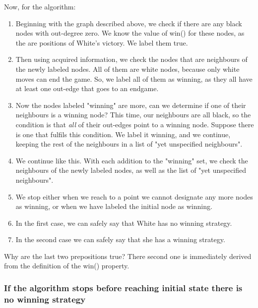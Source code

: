 Now, for the algorithm:

\begin{enumerate}
\item
Beginning with the graph described above, we check if there are any black nodes with out-degree zero. We know the value of win() for these nodes,
as the are positions of White's victory. We label them true.
\item Then using
acquired information, we check the nodes that are neighbours of the newly labeled nodes. All of them are white nodes, because only white moves can end the
game. So, we label all of them as winning, as they all have at least one
out-edge that goes to an endgame.
\item  Now the nodes labeled "winning" are more, can we determine if one of their neighbours is a winning node? This time, our neighbours are all black, so the condition is that \emph{all} of their out-edges point to a winning node. Suppose
there is one that fulfils this condition. We label it winning, and we continue,
keeping the rest of the neighbours in a list of "yet unspecified neighbours".
\item We continue like this. With each addition to the "winning" set, we check the neighbours of the
newly labeled nodes, as well as the list of "yet unspecified neighbours".
\item We stop either when  we reach to a point we cannot
designate any more nodes as winning, or when we have labeled the initial node
as winning.
\item In the first case, we can safely say that White has no winning strategy.
\item In the second case we can safely say that she has a winning strategy.
\end{enumerate}

Why are the last two prepositions true? There second one is immediately derived
from the definition of the win() property.
\subsubsection*{If the algorithm stops before reaching initial state there
is no winning strategy}

